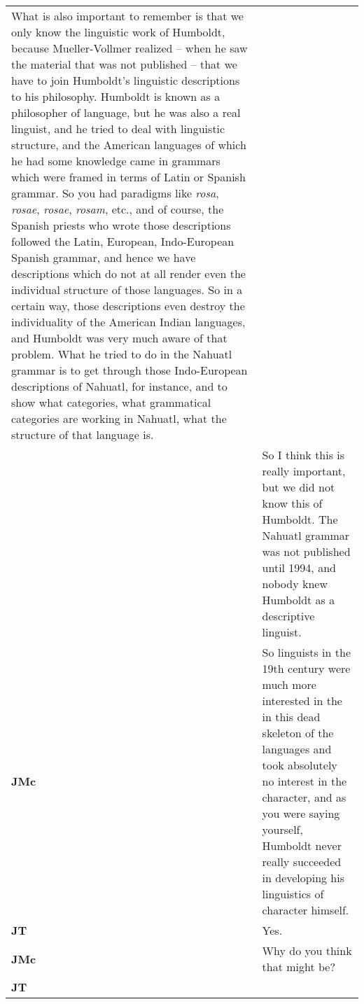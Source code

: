 \documentclass[12pt]{article}
\begin{document}
\begin{flushleft}
\begin{supertabular}{m{0.24415985in}m{5.89766in}}
What is also important to remember is that we only know the linguistic work of Humboldt, because Mueller-Vollmer realized – when he saw the material that was not published – that we have to join Humboldt’s linguistic descriptions to his philosophy. Humboldt is known as a philosopher of language, but he was also a real linguist, and he tried to deal with linguistic structure, and the American languages of which he had some knowledge came in grammars which were framed in terms of Latin or Spanish grammar. So you had paradigms like \textit{rosa}, \textit{rosae}, \textit{rosae}, \textit{rosam}, etc., and of course, the Spanish priests who wrote those descriptions followed the Latin, European, Indo-European Spanish grammar, and hence we have descriptions which do not at all render even the individual structure of those languages. So in a certain way, those descriptions even destroy the individuality of the American Indian languages, and Humboldt was very much aware of that problem. What he tried to do in the Nahuatl grammar is to get through those Indo-European descriptions of Nahuatl, for instance, and to show what categories, what grammatical categories are working in Nahuatl, what the structure of that language is.\\
 &
So I think this is really important, but we did not know this of Humboldt. The Nahuatl grammar was not published until 1994, and nobody knew Humboldt as a descriptive linguist.\\
\textbf{JMc}\newline
 &
So linguists in the 19th century were much more interested in the in this dead skeleton of the languages and took absolutely no interest in the character, and as you were saying yourself, Humboldt never really succeeded in developing his linguistics of character himself.\\
\textbf{JT}\newline
 &
Yes.\\
\textbf{JMc}\newline
 &
Why do you think that might be?\\
\textbf{JT}\newline
 &

\end{supertabular}
\end{flushleft}
\end{document}
